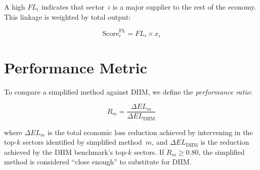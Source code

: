A high $FL_i$ indicates that sector~$i$ is a major supplier to the rest of the economy. This linkage is weighted by total output:

\begin{equation}
    \text{Score}_i^{\text{FL}} = FL_i \times x_i
\end{equation}

\section{Performance Metric}
\label{sec:performance-metric}

To compare a simplified method against DIIM, we define the \emph{performance ratio}:

\begin{equation}
    R_m = \frac{\Delta EL_m}{\Delta EL_{\text{DIIM}}}
    \label{eq:performance-ratio}
\end{equation}

where $\Delta EL_m$ is the total economic loss reduction achieved by intervening in the top-$k$ sectors identified by simplified method~$m$, and $\Delta EL_{\text{DIIM}}$ is the reduction achieved by the DIIM benchmark's top-$k$ sectors. If $R_m \geq 0.80$, the simplified method is considered ``close enough'' to substitute for DIIM.

\newpage
